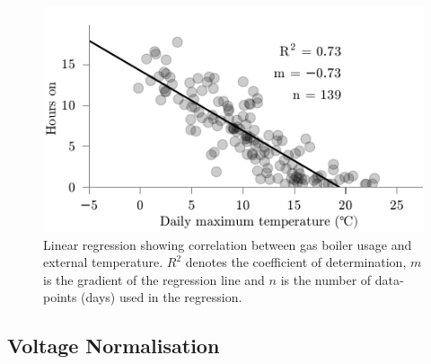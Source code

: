 \documentclass{sig-alternate}
\begin{document}
\begin{figure}[!t]
  \centering
  \includegraphics[width=\columnwidth]{figures/weather_correlations2.pdf} 
  \caption{Linear regression showing correlation between gas boiler
    usage and external temperature. $R^2$ denotes the coefficient of
    determination, $m$ is the gradient of the regression line and $n$
    is the number of data-points (days) used in the regression.}
  \label{fig:weather_correlations} 
\end{figure}

\subsection{Voltage Normalisation}
\end{document}

